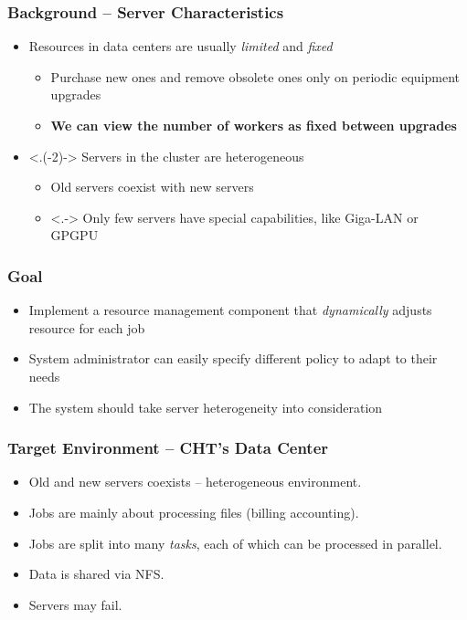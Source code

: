 \begin{frame}
  \frametitle{Background -- Server Characteristics}
  \begin{itemize}[<+->]
    \item Resources in data centers are usually \emph{limited} and
      \emph{fixed}
      \begin{itemize}
        \item Purchase new ones and remove obsolete ones only on
          periodic equipment upgrades
        \item \textbf{We can view the number of workers as fixed between
          upgrades}
      \end{itemize}
    \item <.(-2)-> Servers in the cluster are \alert{heterogeneous}
      \begin{itemize}
        \item Old servers coexist with new servers
        \item <.-> Only few servers have special capabilities, like Giga-LAN
          or GPGPU
      \end{itemize}
  \end{itemize}
\end{frame}

\begin{frame}
  \frametitle{Goal}
  \begin{itemize}
    \item Implement a resource management component that \emph{dynamically}
      adjusts resource for each job
    \item System administrator can easily specify different policy to
      adapt to their needs
    \item The system should take server \alert{heterogeneity} into consideration
  \end{itemize}
\end{frame}

\begin{frame}
  \frametitle{Target Environment -- CHT's Data Center}
  \begin{itemize}
    \item Old and new servers coexists -- heterogeneous environment.
    \item Jobs are mainly about processing files (billing accounting).
    \item Jobs are split into many \emph{tasks}, each of which can be processed
      in parallel.
    \item Data is shared via NFS.
    \item Servers may fail.
  \end{itemize}
\end{frame}

